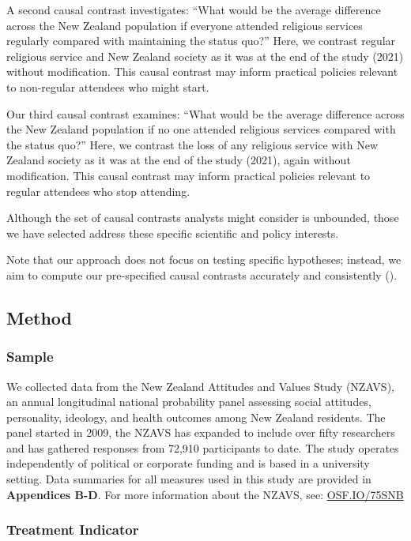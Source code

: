 \documentclass[
  single column]{article}
\begin{document}
A second causal contrast investigates: ``What would be the average
difference across the New Zealand population if everyone attended
religious services regularly compared with maintaining the status quo?''
Here, we contrast regular religious service and New Zealand society as
it was at the end of the study (2021) without modification. This causal
contrast may inform practical policies relevant to non-regular attendees
who might start.

Our third causal contrast examines: ``What would be the average
difference across the New Zealand population if no one attended
religious services compared with the status quo?'' Here, we contrast the
loss of any religious service with New Zealand society as it was at the
end of the study (2021), again without modification. This causal
contrast may inform practical policies relevant to regular attendees who
stop attending.

Although the set of causal contrasts analysts might consider is
unbounded, those we have selected address these specific scientific and
policy interests.

Note that our approach does not focus on testing specific hypotheses;
instead, we aim to compute our pre-specified causal contrasts accurately
and consistently ().

\subsection{Method}\label{method}

\subsubsection{Sample}\label{sample}

We collected data from the New Zealand Attitudes and Values Study
(NZAVS), an annual longitudinal national probability panel assessing
social attitudes, personality, ideology, and health outcomes among New
Zealand residents. The panel started in 2009, the NZAVS has expanded to
include over fifty researchers and has gathered responses from 72,910
participants to date. The study operates independently of political or
corporate funding and is based in a university setting. Data summaries
for all measures used in this study are provided in \textbf{Appendices
B-D}. For more information about the NZAVS, see:
\href{https://doi.org/10.17605/OSF.IO/75SNB}{OSF.IO/75SNB}

\subsubsection{Treatment Indicator}\label{treatment-indicator}
\end{document}
